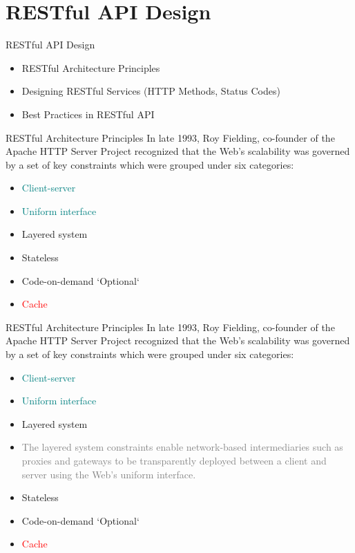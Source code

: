 \documentclass{beamer}
\begin{document}
\section{RESTful API Design}
\begin{frame}{RESTful API Design}
  \begin{itemize}
    \item RESTful Architecture Principles
    \item Designing RESTful Services (HTTP Methods, Status Codes)
    \item Best Practices in RESTful API
  \end{itemize}
\end{frame}


\begin{frame}[t]{RESTful Architecture Principles}
	\scriptsize
	In late 1993, Roy Fielding, co-founder of the Apache HTTP Server Project recognized that the Web’s scalability was governed by a set of key constraints which were grouped under six categories:
	\begin{itemize}
    	\item \textcolor{teal}{Client-server}
    	\item \textcolor{teal}{Uniform interface}
    	\item Layered system
    	\item Stateless
    	\item Code-on-demand `Optional`
    	\item \textcolor{red} {Cache}
	\end{itemize}
\end{frame}

\begin{frame}[t]{RESTful Architecture Principles}
	\scriptsize
	In late 1993, Roy Fielding, co-founder of the Apache HTTP Server Project recognized that the Web’s scalability was governed by a set of key constraints which were grouped under six categories:
	\begin{itemize}
    	\item \textcolor{teal}{Client-server}
    	\item \textcolor{teal}{Uniform interface}

    	\item Layered system
    	\item[] \textcolor{gray}{\tiny The layered system constraints enable network-based intermediaries such as proxies and gateways to be transparently deployed between a client and server using the Web’s uniform interface.} 
    	
    	\item Stateless
    	\item Code-on-demand `Optional`
    	\item \textcolor{red} {Cache}
	\end{itemize}
\end{frame}
\end{document}
